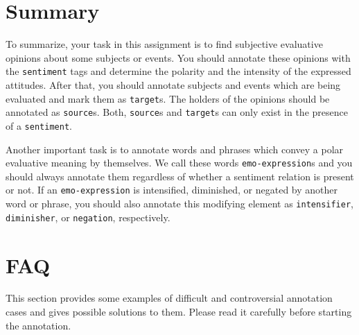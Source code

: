 \documentclass[11pt,a4paper]{article}
\theoremstyle{mytheoremstyle}
\begin{document}
\section{Summary}\label{sec:summary}
To summarize, your task in this assignment is to find subjective
evaluative opinions about some subjects or events.  You should
annotate these opinions with the \texttt{sentiment} tags and determine
the polarity and the intensity of the expressed attitudes.  After
that, you should annotate subjects and events which are being
evaluated and mark them as \texttt{target}s.  The holders of the
opinions should be annotated as \texttt{source}s.  Both,
\texttt{source}s and \texttt{target}s can only exist in the presence
of a \texttt{sentiment}.

Another important task is to annotate words and phrases which convey a
polar evaluative meaning by themselves.  We call these words
\texttt{emo-expression}s and you should always annotate them
regardless of whether a sentiment relation is present or not.  If an
\texttt{emo-expression} is intensified, diminished, or negated by
another word or phrase, you should also annotate this modifying
element as \texttt{intensifier}, \texttt{diminisher}, or
\texttt{negation}, respectively.

\section{FAQ}\label{sec:faq}
This section provides some examples of difficult and controversial
annotation cases and gives possible solutions to them.  Please read it
carefully before starting the annotation.
\end{document}
